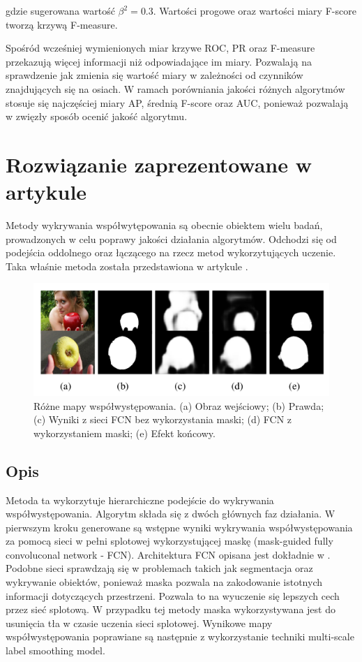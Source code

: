 \documentclass[a4paper,11pt, notitlepage, twosides, openany ]{report}
\begin{document}
	gdzie sugerowana wartość $\beta^2 = 0.3$. Wartości progowe oraz wartości miary F-score tworzą krzywą F-measure. 

	Spośród wcześniej wymienionych miar krzywe ROC, PR oraz F-measure przekazują więcej informacji niż odpowiadające im miary. Pozwalają na sprawdzenie jak zmienia się wartość miary w zależności od czynników znajdujących się na osiach. W ramach porówniania jakości różnych algorytmów stosuje się najczęściej miary AP, średnią F-score oraz AUC, ponieważ pozwalają w zwięzły sposób ocenić jakość algorytmu. 

	\chapter{Rozwiązanie zaprezentowane w artykule}

	Metody wykrywania współwytępowania są obecnie obiektem wielu badań, prowadzonych w celu poprawy jakości działania algorytmów. Odchodzi się od podejścia oddolnego oraz łączącego na rzecz metod wykorzytujących uczenie. Taka właśnie metoda została przedstawiona w artykule \cite{Zhang_2019_CVPR}. 

	\begin{figure}[h!]
		\centering
		\includegraphics[width=1\textwidth]{steps.png}
		\caption{Różne mapy współwystępowania. (a) Obraz wejściowy; (b) Prawda; (c) Wyniki z sieci FCN bez wykorzystania maski; (d) FCN z wykorzystaniem maski; (e)  Efekt końcowy.}
		\label{step}
	\end{figure}

	\section{Opis}
	Metoda ta wykorzytuje hierarchiczne podejście do wykrywania współwystępowania. Algorytm składa się z dwóch głównych faz działania. W pierwszym kroku generowane są wstępne wyniki wykrywania współwystępowania za pomocą sieci w pełni splotowej wykorzystującej maskę (mask-guided fully convoluconal network - FCN). Architektura FCN opisana jest dokładnie w \cite{10.1109/TPAMI.2016.2572683}.	Podobne sieci sprawdzają się w problemach takich jak segmentacja oraz wykrywanie obiektów, ponieważ maska pozwala na zakodowanie istotnych informacji dotyczących przestrzeni. Pozwala to na wyuczenie się lepszych cech przez sieć splotową. W przypadku tej metody maska wykorzystywana jest do usunięcia tła w czasie uczenia sieci splotowej. Wynikowe mapy współwystępowania poprawiane są następnie z wykorzystanie techniki multi-scale label smoothing model.
\end{document}
